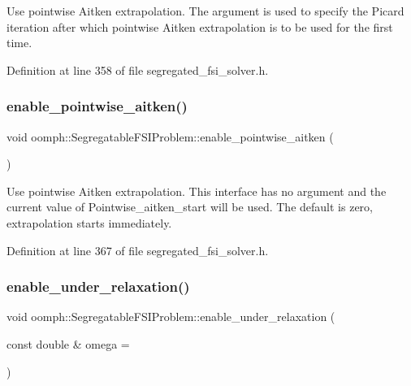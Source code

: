 Use pointwise Aitken extrapolation. The argument is used to specify the Picard iteration after which pointwise Aitken extrapolation is to be used for the first time. 



Definition at line 358 of file segregated\+\_\+fsi\+\_\+solver.\+h.

\mbox{\label{classoomph_1_1SegregatableFSIProblem_a3f52d9c6555b43d8ada274ec80940c13}} 
\subsubsection{\texorpdfstring{enable\+\_\+pointwise\+\_\+aitken()}{enable\_pointwise\_aitken()}\hspace{0.1cm}{\footnotesize\ttfamily [2/2]}}
{\footnotesize\ttfamily void oomph\+::\+Segregatable\+F\+S\+I\+Problem\+::enable\+\_\+pointwise\+\_\+aitken (\begin{DoxyParamCaption}{ }\end{DoxyParamCaption})\hspace{0.3cm}{\ttfamily [inline]}}



Use pointwise Aitken extrapolation. This interface has no argument and the current value of Pointwise\+\_\+aitken\+\_\+start will be used. The default is zero, extrapolation starts immediately. 



Definition at line 367 of file segregated\+\_\+fsi\+\_\+solver.\+h.

\mbox{\label{classoomph_1_1SegregatableFSIProblem_a7ad67f163160a54024fb0bcd5fa531c3}} 
\subsubsection{\texorpdfstring{enable\+\_\+under\+\_\+relaxation()}{enable\_under\_relaxation()}}
{\footnotesize\ttfamily void oomph\+::\+Segregatable\+F\+S\+I\+Problem\+::enable\+\_\+under\+\_\+relaxation (\begin{DoxyParamCaption}\item[{const double \&}]{omega = {} }\end{DoxyParamCaption})\hspace{0.3cm}{\ttfamily [inline]}}



